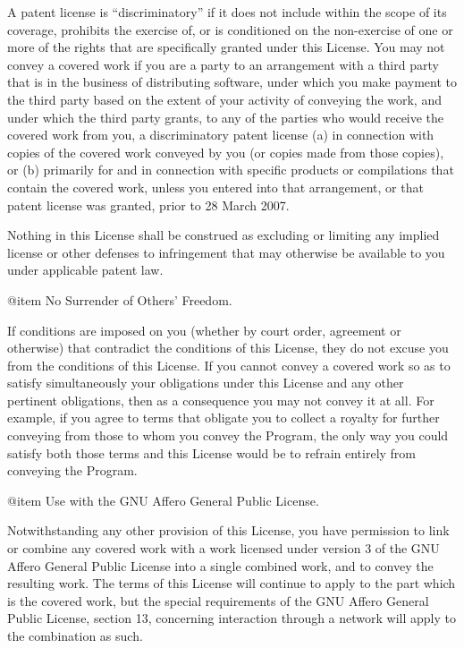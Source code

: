 A patent license is ``discriminatory'' if it does not include within the
scope of its coverage, prohibits the exercise of, or is conditioned on
the non-exercise of one or more of the rights that are specifically
granted under this License.  You may not convey a covered work if you
are a party to an arrangement with a third party that is in the
business of distributing software, under which you make payment to the
third party based on the extent of your activity of conveying the
work, and under which the third party grants, to any of the parties
who would receive the covered work from you, a discriminatory patent
license (a) in connection with copies of the covered work conveyed by
you (or copies made from those copies), or (b) primarily for and in
connection with specific products or compilations that contain the
covered work, unless you entered into that arrangement, or that patent
license was granted, prior to 28 March 2007.

Nothing in this License shall be construed as excluding or limiting
any implied license or other defenses to infringement that may
otherwise be available to you under applicable patent law.

@item No Surrender of Others' Freedom.

If conditions are imposed on you (whether by court order, agreement or
otherwise) that contradict the conditions of this License, they do not
excuse you from the conditions of this License.  If you cannot convey
a covered work so as to satisfy simultaneously your obligations under
this License and any other pertinent obligations, then as a
consequence you may not convey it at all.  For example, if you agree
to terms that obligate you to collect a royalty for further conveying
from those to whom you convey the Program, the only way you could
satisfy both those terms and this License would be to refrain entirely
from conveying the Program.

@item Use with the GNU Affero General Public License.

Notwithstanding any other provision of this License, you have
permission to link or combine any covered work with a work licensed
under version 3 of the GNU Affero General Public License into a single
combined work, and to convey the resulting work.  The terms of this
License will continue to apply to the part which is the covered work,
but the special requirements of the GNU Affero General Public License,
section 13, concerning interaction through a network will apply to the
combination as such.

